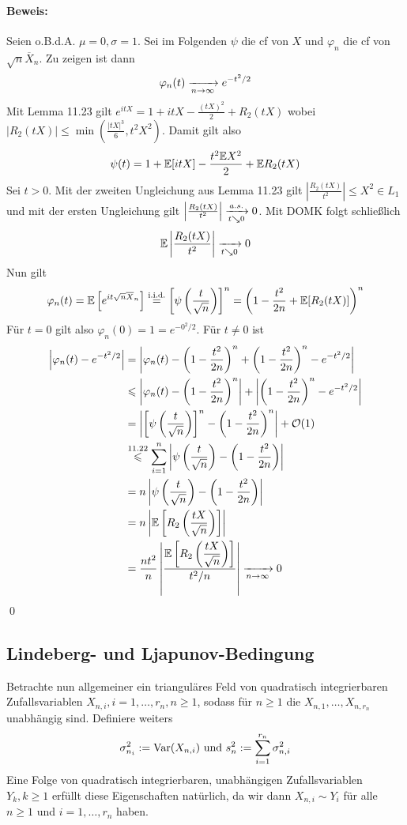 \documentclass[11pt]{report}
\begin{document}
 \paragraph{Beweis:}Seien o.B.d.A. $\mu=0,\sigma=1$. Sei im Folgenden $\psi$ die cf von $X$ und $\varphi_n$ die cf von $\sqrt{n}\overline X_n$. Zu zeigen ist dann
 $$\varphi_n(t)\nto{}{n\to\infty}e^{-t^2/2}$$
 Mit Lemma 11.23 gilt $e^{itX}=1+itX-\frac{(tX)^2}{2}+R_2(tX)$
 wobei $|R_2(tX)|\leq\min\left(\frac{|tX|^3}{6},t^2X^2\right)$. Damit gilt also
 $$\psi(t)=1+\mathbb{E}[itX]-\dfrac{t^2\mathbb{E} X^2}{2}+\mathbb{E} R_2(tX)$$
 Sei $t>0$. Mit der zweiten Ungleichung aus Lemma 11.23 gilt $\left|\frac{R_2(tX)}{t^2}\right|\leq X^2\in L_1$ und mit der ersten Ungleichung gilt $\left|\frac{R_2(tX)}{t^2}\right|\nto{a.s.}{t\searrow0}0$. Mit DOMK folgt schlie\ss{}lich
 $$\E\left|\frac{R_2(tX)}{t^2}\right|\nto{}{t\searrow0}0$$
 Nun gilt
 $$\varphi_n(t)=\mathbb{E}\left[e^{it\sqrt{n}\overline X_n}\right]\overset{\text{i.i.d.}}{=}\left[\psi\left(\frac{t}{\sqrt{n}}\right)\right]^n=\left(1-\frac{t^2}{2n}+\mathbb{E}[R_2(tX)]\right)^n$$
 F\"ur $t=0$ gilt also $\varphi_n(0)=1=e^{-0^2/2}$.\newpage
 F\"ur $t\neq0$ ist 
 \begin{align*}
     \left|\varphi_n(t)-e^{-t^2/2}\right|&=\left|\varphi_n(t)-\left(1-\dfrac{t^2}{2n}\right)^n+\left(1-\dfrac{t^2}{2n}\right)^n-e^{-t^2/2}\right|\\
     &\leq\left|\varphi_n(t)-\left(1-\dfrac{t^2}{2n}\right)^n\right|+\left|\left(1-\dfrac{t^2}{2n}\right)^n-e^{-t^2/2}\right|\\
     &=\left|\left[\psi\left(\dfrac{t}{\sqrt{n}}\right)\right]^n-\left(1-\dfrac{t^2}{2n}\right)^n\right|+\mathcal{O}(1)\\
     &\overset{11.22}{\leq}\sum_{i=1}^n\left|\psi\left(\dfrac{t}{\sqrt{n}}\right)-\left(1-\dfrac{t^2}{2n}\right)\right|\\
     &=n\left|\psi\left(\dfrac{t}{\sqrt{n}}\right)-\left(1-\dfrac{t^2}{2n}\right)\right|\\
     &=n\left|\E \left[R_2\left(\dfrac{tX}{\sqrt{n}}\right)\right]\right|\\
     &=\dfrac{nt^2}{n}\left|\dfrac{\E \left[R_2\left(\dfrac{tX}{\sqrt{n}}\right)\right]}{t^2/n}\right|\nto{}{n\to\infty}0
 \end{align*}
 \qed
 
 \subsection*{Lindeberg- und Ljapunov-Bedingung}
 Betrachte nun allgemeiner ein trianguläres Feld von quadratisch integrierbaren Zufallsvariablen $X_{n,i},i=1,\hdots,r_n,n\geq1$, sodass für $n\geq1$ die $X_{n,1},\hdots,X_{n,r_n}$ unabhängig sind. Definiere weiters
 $$\sigma_{n_i}^2:=\operatorname{Var}(X_{n,i})\text{ und }s_n^2:=\sum_{i=1}^{r_n}\sigma_{n,i}^2$$
 Eine Folge von quadratisch integrierbaren, unabhängigen Zufallsvariablen $Y_k,k\geq1$ erfüllt diese Eigenschaften natürlich, da wir dann $X_{n,i}\sim Y_i$ für alle $n\geq1$ und $i=1,\hdots,r_n$ haben.
 
\end{document}
